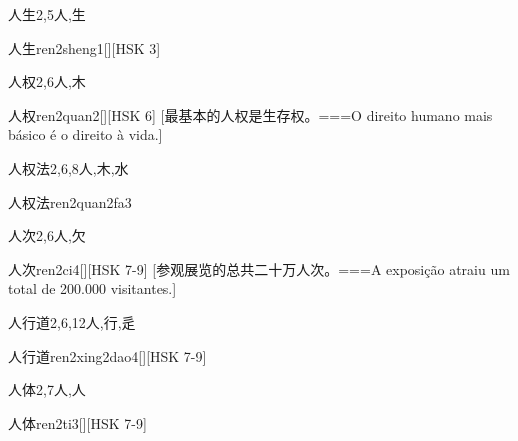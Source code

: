 \begin{Entry}{人生}{2,5}{⼈,⽣}
  \begin{Phonetics}{人生}{ren2sheng1}[][HSK 3]
  \end{Phonetics}
\end{Entry}

\begin{Entry}{人权}{2,6}{⼈,⽊}
  \begin{Phonetics}{人权}{ren2quan2}[][HSK 6]
    [最基本的人权是生存权。===O direito humano mais básico é o direito à vida.]
  \end{Phonetics}
\end{Entry}

\begin{Entry}{人权法}{2,6,8}{⼈,⽊,⽔}
  \begin{Phonetics}{人权法}{ren2quan2fa3}
  \end{Phonetics}
\end{Entry}

\begin{Entry}{人次}{2,6}{⼈,⽋}
  \begin{Phonetics}{人次}{ren2ci4}[][HSK 7-9]
    [参观展览的总共二十万人次。===A exposição atraiu um total de 200.000 visitantes.]
  \end{Phonetics}
\end{Entry}

\begin{Entry}{人行道}{2,6,12}{⼈,⾏,⾡}
  \begin{Phonetics}{人行道}{ren2xing2dao4}[][HSK 7-9]
  \end{Phonetics}
\end{Entry}

\begin{Entry}{人体}{2,7}{⼈,⼈}
  \begin{Phonetics}{人体}{ren2ti3}[][HSK 7-9]
  \end{Phonetics}
\end{Entry}

